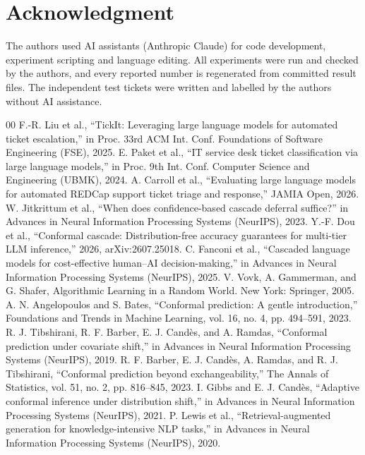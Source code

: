 \documentclass[conference,a4paper]{IEEEtran}
\begin{document}
\section*{Acknowledgment}
The authors used AI assistants (Anthropic Claude) for code development, experiment scripting and language editing. All experiments were run and checked by the authors, and every reported number is regenerated from committed result files. The independent test tickets were written and labelled by the authors without AI assistance.

\begin{thebibliography}{00}
 F.-R. Liu et al., ``TickIt: Leveraging large language models for automated ticket escalation,'' in Proc. 33rd ACM Int. Conf. Foundations of Software Engineering (FSE), 2025.
 E. Paket et al., ``IT service desk ticket classification via large language models,'' in Proc. 9th Int. Conf. Computer Science and Engineering (UBMK), 2024.
 A. Carroll et al., ``Evaluating large language models for automated REDCap support ticket triage and response,'' JAMIA Open, 2026.
 W. Jitkrittum et al., ``When does confidence-based cascade deferral suffice?'' in Advances in Neural Information Processing Systems (NeurIPS), 2023.
 Y.-F. Dou et al., ``Conformal cascade: Distribution-free accuracy guarantees for multi-tier LLM inference,'' 2026, arXiv:2607.25018.
 C. Fanconi et al., ``Cascaded language models for cost-effective human--AI decision-making,'' in Advances in Neural Information Processing Systems (NeurIPS), 2025.
 V. Vovk, A. Gammerman, and G. Shafer, Algorithmic Learning in a Random World. New York: Springer, 2005.
 A. N. Angelopoulos and S. Bates, ``Conformal prediction: A gentle introduction,'' Foundations and Trends in Machine Learning, vol. 16, no. 4, pp. 494--591, 2023.
 R. J. Tibshirani, R. F. Barber, E. J. Cand\`{e}s, and A. Ramdas, ``Conformal prediction under covariate shift,'' in Advances in Neural Information Processing Systems (NeurIPS), 2019.
 R. F. Barber, E. J. Cand\`{e}s, A. Ramdas, and R. J. Tibshirani, ``Conformal prediction beyond exchangeability,'' The Annals of Statistics, vol. 51, no. 2, pp. 816--845, 2023.
 I. Gibbs and E. J. Cand\`{e}s, ``Adaptive conformal inference under distribution shift,'' in Advances in Neural Information Processing Systems (NeurIPS), 2021.
 P. Lewis et al., ``Retrieval-augmented generation for knowledge-intensive NLP tasks,'' in Advances in Neural Information Processing Systems (NeurIPS), 2020.

\end{thebibliography}
\end{document}
